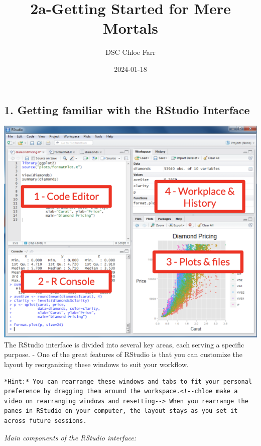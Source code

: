 \documentclass[
]{article}
\title{2a-Getting Started for Mere Mortals}
\author{DSC Chloe Farr}
\date{2024-01-18}
\begin{document}
\maketitle

\hypertarget{getting-familiar-with-the-rstudio-interface}{%
\subsection{1. Getting familiar with the RStudio
Interface}\label{getting-familiar-with-the-rstudio-interface}}

\includegraphics{images/rstudio-01.png} The RStudio interface is divided
into several key areas, each serving a specific purpose. - One of the
great features of RStudio is that you can customize the layout by
reorganizing these windows to suit your workflow.

\begin{verbatim}
*Hint:* You can rearrange these windows and tabs to fit your personal preference by dragging them around the workspace.<!--chloe make a video on rearranging windows and resetting--> When you rearrange the panes in RStudio on your computer, the layout stays as you set it across future sessions.
\end{verbatim}

\emph{Main components of the RStudio interface:}
\end{document}
